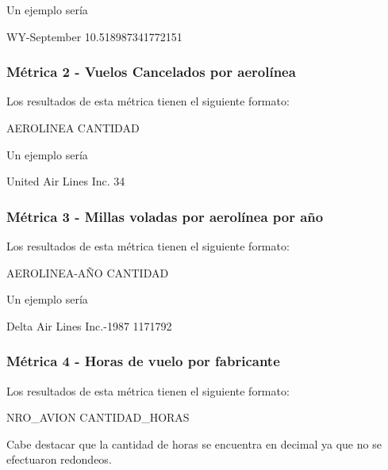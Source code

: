 \documentclass[a4paper,10pt]{article}
\begin{document}
            Un ejemplo sería\\
            \begin{center}
                WY-September    10.518987341772151\\
            \end{center}

        \subsubsection{Métrica 2 - Vuelos Cancelados por aerolínea}
            Los resultados de esta métrica tienen el siguiente formato:\\
            \begin{center}
                AEROLINEA CANTIDAD\\
            \end{center}

            Un ejemplo sería\\
            \begin{center}
               United Air Lines Inc.   34\\
            \end{center}

        \subsubsection{Métrica 3 - Millas voladas por aerolínea por año}
            Los resultados de esta métrica tienen el siguiente formato:\\
            \begin{center}
                AEROLINEA-AÑO CANTIDAD\\
            \end{center}

            Un ejemplo sería\\
            \begin{center}
               Delta Air Lines Inc.-1987   1171792\\
            \end{center}

        \subsubsection{Métrica 4 - Horas de vuelo por fabricante}
            Los resultados de esta métrica tienen el siguiente formato:\\
            \begin{center}
                NRO\_AVION CANTIDAD\_HORAS
            \end{center}
            Cabe destacar que la cantidad de horas se encuentra en decimal ya que no se efectuaron redondeos.
\end{document}

